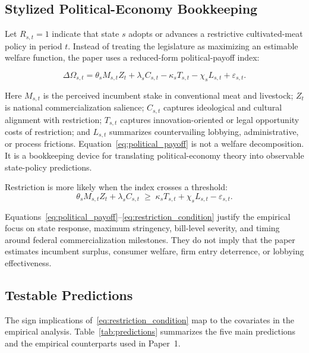 \documentclass[12pt]{article}
\begin{document}
\subsection{Stylized Political-Economy Bookkeeping}

Let $R_{s,t}=1$ indicate that state $s$ adopts or advances a restrictive cultivated-meat policy in period $t$.  Instead of treating the legislature as maximizing an estimable welfare function, the paper uses a reduced-form political-payoff index:

\begin{equation}
\Delta \Omega_{s,t}
=
\theta_s M_{s,t} Z_t
+ \lambda_s C_{s,t}
- \kappa_s T_{s,t}
- \chi_s L_{s,t}
+ \varepsilon_{s,t}.
\label{eq:political_payoff}
\end{equation}

Here $M_{s,t}$ is the perceived incumbent stake in conventional meat and livestock; $Z_t$ is national commercialization salience; $C_{s,t}$ captures ideological and cultural alignment with restriction; $T_{s,t}$ captures innovation-oriented or legal opportunity costs of restriction; and $L_{s,t}$ summarizes countervailing lobbying, administrative, or process frictions.  Equation~\eqref{eq:political_payoff} is not a welfare decomposition.  It is a bookkeeping device for translating political-economy theory into observable state-policy predictions.

Restriction is more likely when the index crosses a threshold:
\begin{equation}
\theta_s M_{s,t} Z_t + \lambda_s C_{s,t}
\;\geq\;
\kappa_s T_{s,t} + \chi_s L_{s,t} - \varepsilon_{s,t}.
\label{eq:restriction_condition}
\end{equation}

Equations~\eqref{eq:political_payoff}--\eqref{eq:restriction_condition} justify the empirical focus on state response, maximum stringency, bill-level severity, and timing around federal commercialization milestones.  They do not imply that the paper estimates incumbent surplus, consumer welfare, firm entry deterrence, or lobbying effectiveness.

\subsection{Testable Predictions}

The sign implications of~\eqref{eq:restriction_condition} map to the covariates in the empirical analysis.  Table~\ref{tab:predictions} summarizes the five main predictions and the empirical counterparts used in Paper~1.
\end{document}
